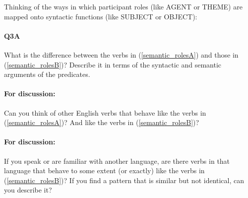 \documentclass{article}
\begin{document}
Thinking of the ways in which participant roles (like AGENT or THEME) are mapped onto syntactic functions (like SUBJECT or OBJECT):

\paragraph{Q3A} What is the difference between the verbs in (\ref{semantic_rolesA}) and those in (\ref{semantic_rolesB})? Describe it in terms of the syntactic and semantic arguments of the predicates.

\paragraph{For discussion:} Can you think of other English verbs that behave like the verbs in (\ref{semantic_rolesA})? And like the verbs in (\ref{semantic_rolesB})?

\paragraph{For discussion:} If you speak or are familiar with another language, are there verbs in that language that behave to some extent (or exactly) like the verbs in (\ref{semantic_rolesB})? If you find a pattern that is similar but not identical, can you describe it?
\end{document}
